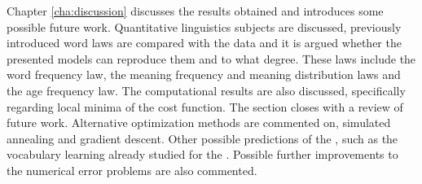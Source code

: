 Chapter \ref{cha:discussion} discusses the results obtained and introduces some possible future work.
Quantitative linguistics subjects are discussed, previously introduced word laws are compared with the data and it is argued whether the presented models can reproduce them and to what degree.
These laws include the word frequency law, the meaning frequency and meaning distribution laws and the age frequency law.
The computational results are also discussed, specifically regarding local minima of the cost function.
The section closes with a review of future work.
Alternative optimization methods are commented on, simulated annealing and gradient descent.
Other possible predictions of the \secondmodel{}, such as the vocabulary learning already studied for the \firstmodel{} \cite{Ferrer2017a} \cite{Carrera2021a}.
Possible further improvements to the numerical error problems are also commented.

